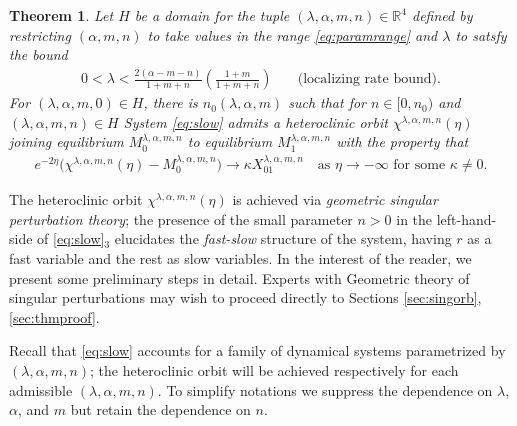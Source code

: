\documentclass[a4paper,11pt]{article}
\newtheorem{theorem}{Theorem}
\theoremstyle{remark}
\begin{document}
\begin{theorem} \label{thm1}
Let $H$ be a domain for the tuple $(\lambda,\alpha,m,n)\in\mathbb{R}^4$ defined by restricting $(\alpha,m,n)$ to take values in the range
\eqref{eq:paramrange} and $\lambda$ to satsfy the bound
 \begin{align*}
  0< \lambda < \frac{2(\alpha-m-n)}{1+m+n}\left(\frac{1+m}{1+m+n}\right) \quad&\text{(localizing rate bound)}. %
\end{align*}
 For $(\lambda,\alpha,m,0) \in H$, there is $n_0( \lambda,\alpha,m)$ such that for $n \in [0, n_0)$ and $(\lambda,\alpha,m,n) \in H$ System \eqref{eq:slow}  admits a heteroclinic orbit $\chi^{\lambda,\alpha,m,n}(\eta)$ joining equilibrium $M_0^{\lambda,\alpha,m,n}$ to equilibrium $M_1^{\lambda,\alpha,m,n}$ with the property that
    \begin{align} \label{eq:rapid}
        e^{-2\eta}\big(\chi^{\lambda,\alpha,m,n}(\eta) - M_0^{\lambda,\alpha,m,n}\big) \rightarrow \kappa X_{01}^{\lambda,\alpha,m,n} \quad \text{as $\eta \rightarrow -\infty$ for some $\kappa\ne0$}.
    \end{align}
\end{theorem}

The heteroclinic orbit $\chi^{\lambda,\alpha,m,n}(\eta)$ is achieved via {\it geometric singular perturbation theory}; the presence of the small parameter $n>0$ in the left-hand-side of \eqref{eq:slow}$_3$ elucidates the {\it fast-slow} structure of the system, having $r$ as a fast variable and the rest as slow variables.  
In the interest of the reader, we present some preliminary steps in detail. Experts with Geometric theory of singular
perturbations may wish to proceed directly to Sections \ref{sec:singorb}, \ref{sec:thmproof}. 

Recall that \eqref{eq:slow} accounts for a family of dynamical systems parametrized by $(\lambda,\alpha,m,n)$; the heteroclinic orbit will be achieved respectively for each admissible $(\lambda,\alpha,m,n)$. To simplify notations we suppress the dependence on $\lambda$, $\alpha$, and $m$ but retain
the dependence on $n$.
\end{document}
